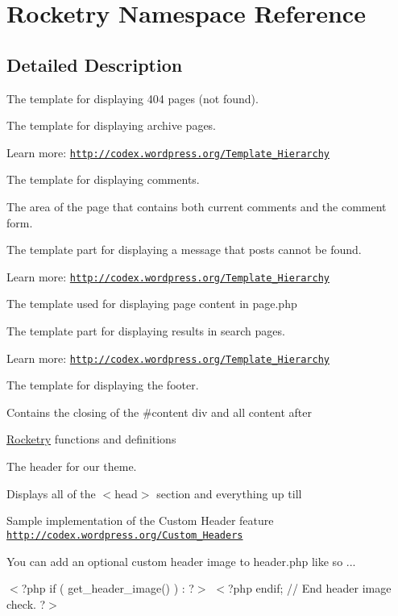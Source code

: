 \hypertarget{namespace_rocketry}{}\section{Rocketry Namespace Reference}
\label{namespace_rocketry}


\subsection{Detailed Description}
The template for displaying 404 pages (not found).

The template for displaying archive pages.

Learn more\+: \href{http://codex.wordpress.org/Template_Hierarchy}{\tt http\+://codex.\+wordpress.\+org/\+Template\+\_\+\+Hierarchy}

The template for displaying comments.

The area of the page that contains both current comments and the comment form.

The template part for displaying a message that posts cannot be found.

Learn more\+: \href{http://codex.wordpress.org/Template_Hierarchy}{\tt http\+://codex.\+wordpress.\+org/\+Template\+\_\+\+Hierarchy}

The template used for displaying page content in page.\+php

The template part for displaying results in search pages.

Learn more\+: \href{http://codex.wordpress.org/Template_Hierarchy}{\tt http\+://codex.\+wordpress.\+org/\+Template\+\_\+\+Hierarchy}

The template for displaying the footer.

Contains the closing of the \#content div and all content after

\hyperlink{namespace_rocketry}{Rocketry} functions and definitions

The header for our theme.

Displays all of the $<$head$>$ section and everything up till 

Sample implementation of the Custom Header feature \href{http://codex.wordpress.org/Custom_Headers}{\tt http\+://codex.\+wordpress.\+org/\+Custom\+\_\+\+Headers}

You can add an optional custom header image to header.\+php like so ...

 $<$?php if ( get\+\_\+header\+\_\+image() ) \+: ?$>$ \href{<?php echo esc_url( home_url( '/' ) ); ?>}{\tt } $<$?php endif; // End header image check. ?$>$

